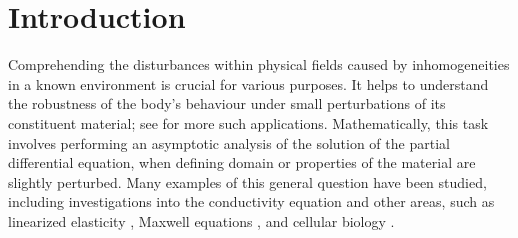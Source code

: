 \documentclass[12pt,a4paper]{amsart}
\numberwithin{equation}{section}
\theoremstyle{plain}
\theoremstyle{definition}
\begin{document}

 
	\tableofcontents
	
	\section{Introduction}
	Comprehending the disturbances within physical fields caused by inhomogeneities in a known environment is crucial for various purposes. It helps to understand the robustness of the body's behaviour under small perturbations of its constituent material; see \cite{AmmariKang2004, BonnetierDapognyVogelius} for more such applications. Mathematically, this task involves performing an asymptotic analysis of the solution of the partial differential equation, when defining domain or properties of the material are slightly perturbed. Many examples of this general question have been studied, including investigations into the conductivity equation \cite{CapdeboscqVogelius,AmmariSeo,Cedio-FengyaMoskowVogelius} and other areas, such as linearized elasticity \cite{AmmariKangNakamuraTanuma, BerettaBonnetierFranciniMazzucato}, Maxwell equations \cite{AmmariVogeliusVolkov,Griesmaier}, and cellular biology \cite{holcman2015stochastic,BressloffNewby}. 
	
\end{document}
